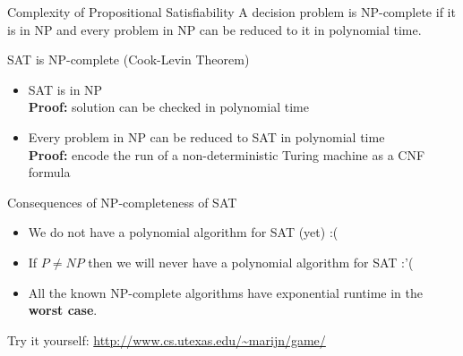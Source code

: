 \documentclass[t]{sdqbeamer}
\begin{document}
\begin{frame}{Complexity of Propositional Satisfiability}
\vspace*{-1em}
A decision problem is NP-complete if it is in NP and every problem in NP can be reduced to it in polynomial time.
\begin{block}{SAT is NP-complete (Cook-Levin Theorem)}
\begin{itemize}\setlength{\itemsep}{.5ex}
	\item SAT is in NP\\
	\textbf{Proof:} solution can be checked in polynomial time
	\item Every problem in NP can be reduced to SAT in polynomial time\\
	\textbf{Proof:} encode the run of a non-deterministic Turing machine as a CNF formula
\end{itemize}
\end{block}
\pause
\begin{block}{Consequences of NP-completeness of SAT}
\begin{itemize}
	\item We do not have a polynomial algorithm for SAT (yet) :(
	\item If $P \neq NP$ then we will never have a polynomial algorithm for SAT :'(
	\item All the known NP-complete algorithms have exponential runtime in the \textbf{worst case}.
\end{itemize}
\end{block}

\begin{example}[Hardness]
Try it yourself: \url{http://www.cs.utexas.edu/~marijn/game/}
\end{example}
\end{frame}
\end{document}
